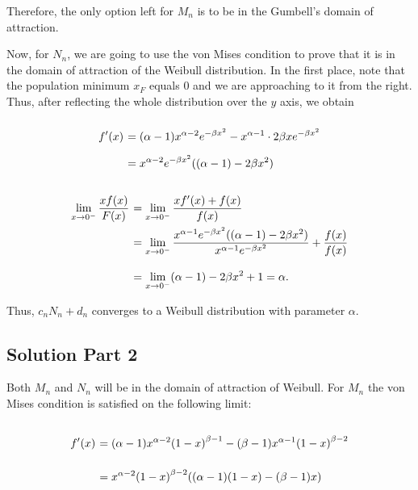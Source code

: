 Therefore, the only option left for $M_n$ is to be in the Gumbell's domain of attraction.

Now, for $N_n$, we are going to use the von Mises condition to prove that it is in the domain of attraction of the Weibull distribution. In the first place, note that the population minimum $x_F$ equals $0$ and we are approaching to it from the right. Thus, after reflecting the whole distribution over the $y$ axis, we obtain

\[ \everymath{\displaystyle}
\arraycolsep=1.8pt\def\arraystretch{2}
\begin{array}{rl}
    f'(x) & = (\alpha-1)x^{\alpha-2} e^{-\beta x^2} - x^{\alpha-1} \cdot 2\beta x e^{-\beta x^2}\\
    & = x^{\alpha-2} e^{-\beta x^2}((\alpha-1)-2\beta x^2)
\end{array} \]

\[ \everymath{\displaystyle}
\arraycolsep=1.8pt\def\arraystretch{2.5}
\begin{array}{rl}
    \lim_{x\to 0^-} \frac{x f(x)}{F(x)}& = \lim_{x\to 0^-} \frac{xf'(x) + f(x)}{f(x)}\\
    & = \lim_{x\to 0^-} \frac{x^{\alpha-1} e^{-\beta x^2}((\alpha-1)-2\beta x^2)}{x^{\alpha-1} e^{-\beta x^2}} + \frac{f(x)}{f(x)}\\
    & = \lim_{x\to 0^-} (\alpha - 1) - 2\beta x^2 +1 = \alpha.
\end{array} \]

Thus, $c_n N_n + d_n$ converges to a Weibull distribution with parameter $\alpha$.

\subsection*{Solution Part 2}

Both $M_n$ and $N_n$ will be in the domain of attraction of Weibull. For $M_n$ the von Mises condition is satisfied on the following limit:

\[ \everymath{\displaystyle}
\arraycolsep=1.8pt\def\arraystretch{2.5}
\begin{array}{rl}
    f'(x) & = (\alpha-1) x^{\alpha-2}{(1-x)}^{\beta-1} - (\beta -1) x^{\alpha-1}{(1-x)}^{\beta-2}\\
    & = x^{\alpha-2}{(1-x)}^{\beta-2}((\alpha-1)(1-x)-(\beta-1)x)
\end{array}\]

